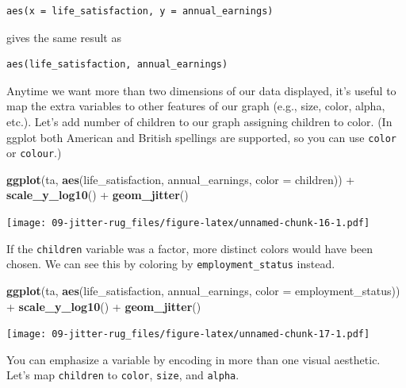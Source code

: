 \documentclass[]{book}
\newenvironment{Shaded}{\begin{snugshade}}{\end{snugshade}}
\newcommand{\KeywordTok}[1]{\textcolor[rgb]{0.13,0.29,0.53}{\textbf{{#1}}}}
\newcommand{\DataTypeTok}[1]{\textcolor[rgb]{0.13,0.29,0.53}{{#1}}}
\newcommand{\StringTok}[1]{\textcolor[rgb]{0.31,0.60,0.02}{{#1}}}
\newcommand{\NormalTok}[1]{{#1}}
\theoremstyle{definition}
\theoremstyle{definition}
\theoremstyle{remark}
\begin{document}
\begin{verbatim}
aes(x = life_satisfaction, y = annual_earnings)
\end{verbatim}

gives the same result as

\begin{verbatim}
aes(life_satisfaction, annual_earnings)
\end{verbatim}

Anytime we want more than two dimensions of our data displayed, it's
useful to map the extra variables to other features of our graph (e.g.,
size, color, alpha, etc.). Let's add number of children to our graph
assigning children to color. (In ggplot both American and British
spellings are supported, so you can use \texttt{color} or
\texttt{colour}.)

\begin{Shaded}
\begin{Highlighting}[]
\KeywordTok{ggplot}\NormalTok{(ta, }\KeywordTok{aes}\NormalTok{(life_satisfaction, annual_earnings, }\DataTypeTok{color =} \NormalTok{children)) +}\StringTok{ }
\StringTok{  }\KeywordTok{scale_y_log10}\NormalTok{() +}\StringTok{ }
\StringTok{  }\KeywordTok{geom_jitter}\NormalTok{()}
\end{Highlighting}
\end{Shaded}

\texttt{[image: 09-jitter-rug\_files/figure-latex/unnamed-chunk-16-1.pdf]}

If the \texttt{children} variable was a factor, more distinct colors
would have been chosen. We can see this by coloring by
\texttt{employment\_status} instead.

\begin{Shaded}
\begin{Highlighting}[]
\KeywordTok{ggplot}\NormalTok{(ta, }\KeywordTok{aes}\NormalTok{(life_satisfaction, annual_earnings, }\DataTypeTok{color =} \NormalTok{employment_status)) +}\StringTok{ }
\StringTok{  }\KeywordTok{scale_y_log10}\NormalTok{() +}\StringTok{ }
\StringTok{  }\KeywordTok{geom_jitter}\NormalTok{()}
\end{Highlighting}
\end{Shaded}

\texttt{[image: 09-jitter-rug\_files/figure-latex/unnamed-chunk-17-1.pdf]}

You can emphasize a variable by encoding in more than one visual
aesthetic. Let's map \texttt{children} to \texttt{color}, \texttt{size},
and \texttt{alpha}.
\end{document}
